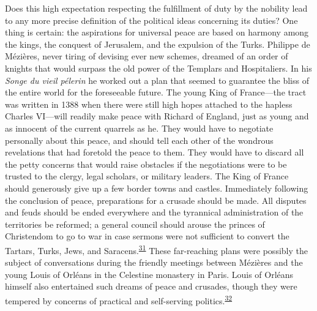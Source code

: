 Does this high expectation respecting the fulfillment of duty by the
nobility lead to any more precise definition of the political ideas
concerning its duties? One thing is certain: the aspirations for
universal peace are based on harmony among the kings, the conquest of
Jerusalem, and the expulsion of the Turks. Philippe de Mézières, never
tiring of devising ever new schemes, dreamed of an order of knights that
would surpass the old power of the Templars and Hospitaliers. In his
\emph{Songe du vieil pélerin} he worked out a plan that seemed to
guarantee the bliss of the entire world for the foreseeable future. The
young King of France---the tract was written in 1388 when there were
still high hopes attached to the hapless Charles VI---will readily make
peace with Richard of England, just as young and as innocent of the
current quarrels as he. They would have to negotiate personally about
this peace, and should tell each other of the wondrous revelations that
had foretold the peace to them. They would have to discard all the petty
concerns that would raise obstacles if the negotiations were to be
trusted to the clergy, legal scholars, or military leaders. The King of
France should generously give up a few border towns and castles.
Immediately following the conclusion of peace, preparations for a
crusade should be made. All disputes and feuds should be ended
everywhere and the tyrannical administration of the territories be
reformed; a general council should arouse the princes of Christendom to
go to war in case sermons were not sufficient to convert the Tartars,
Turks, Jews, and
Saracens.\textsuperscript{\protect\hypertarget{10_Chapter_Three__THE_HEROIC_DREAM.xhtmlux5cux23id_1870}{\protect\hyperlink{23_NOTES.xhtmlux5cux23id_1871}{31}}}
These far-reaching plans were possibly the subject of conversations
during the friendly meetings between Mézières and the young Louis of
Orléans in the Celestine monastery in Paris. Louis of Orléans himself
also entertained such dreams of peace and crusades, though they were
tempered by concerns of practical and self-serving
politics.\textsuperscript{\protect\hypertarget{10_Chapter_Three__THE_HEROIC_DREAM.xhtmlux5cux23id_1868}{\protect\hyperlink{23_NOTES.xhtmlux5cux23id_1869}{32}}}

